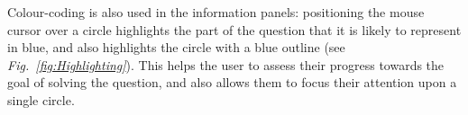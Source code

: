\documentclass[12pt,twoside,notitlepage,xetex]{report}
\begin{document}
Colour-coding is also used in the information panels: positioning the mouse cursor over a circle highlights the part of the question that it is likely to represent in blue, and also highlights the circle with a blue outline (see \emph{Fig.~\ref{fig:Highlighting}}).  This helps the user to assess their progress towards the goal of solving the question, and also allows them to focus their attention upon a single circle.

\begin{center}
\begin{figure}[H]
\begin{center}

\end{center}
\end{figure}
\end{center}
\end{document}

